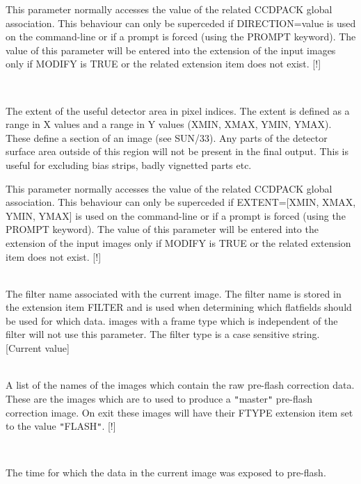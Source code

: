 \documentclass[twoside,11pt]{article}
\renewcommand{\_}{\texttt{\symbol{95}}}
\newcommand{\qt}[1]{{\tt "}#1{\tt "}}
\newcommand{\sstsubsection}[1]{ \item[{#1}] \mbox{} \\}
\newcommand{\sstsubsection}[1]{\item[{#1}]}
\begin{document}
{{{         This parameter normally accesses the value of the related
         CCDPACK global association. This behaviour can only be
         superceded if DIRECTION=value is used on the command-line
         or if a prompt is forced (using the PROMPT keyword). The
         value of this parameter will be entered into the extension of
         the input images only if MODIFY is TRUE or the related extension
         item does not exist.
         [!]
      }
      \sstsubsection{
         EXTENT( 4 ) = \_INTEGER (Read)
      } {
         The extent of the useful detector area in pixel indices.  The
         extent is defined as a range in X values and a range in Y
         values (XMIN, XMAX, YMIN, YMAX). These define a section of an image
         (see SUN/33). Any parts of the detector surface area outside
         of this region will not be present in the final output. This is
         useful for excluding bias strips, badly vignetted parts etc.

         This parameter normally accesses the value of the related
         CCDPACK global association. This behaviour can only be
         superceded if EXTENT=[XMIN, XMAX, YMIN, YMAX] is used on the
         command-line or if a prompt is forced (using the PROMPT
         keyword). The value of this parameter will be entered into the
         extension of the input images only if MODIFY is TRUE or the
         related extension item does not exist.
         [!]
      }
      \sstsubsection{
         FILTER = LITERAL (Read)
      } {
         The filter name associated with the current image. The filter
         name is stored in the extension item FILTER and is used when
         determining which flatfields should be used for which data.
         images with a frame type which is independent of the filter will
         not use this parameter. The filter type is a case sensitive
         string.
         [Current value]
      }
      \sstsubsection{
         FLASH = LITERAL (Read)
      } {
         A list of the names of the images which contain the raw
         pre-flash correction data. These are the images which are to
         used to produce a \qt{master} pre-flash correction image. On exit
         these images will have their FTYPE extension item set to the
         value \qt{FLASH}.
         [!]
      }
      \sstsubsection{
         FLASHTIME  = \_DOUBLE (Read)
      } {
         The time for which the data in the current image was exposed to
         pre-flash.

}}}
\end{document}
